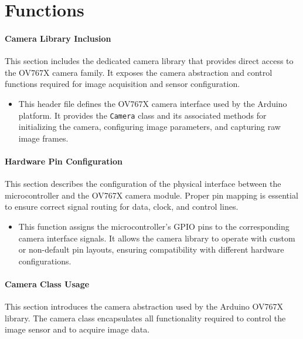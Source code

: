 \section{Functions}

\paragraph{Camera Library Inclusion}
This section includes the dedicated camera library that provides direct access to the OV767X camera family. It exposes the camera abstraction and control functions required for image acquisition and sensor configuration.

\begin{itemize}
	\item {} 
	
	This header file defines the OV767X camera interface used by the Arduino platform. It provides the \texttt{Camera} class and its associated methods for initializing the camera, configuring image parameters, and capturing raw image frames.
\end{itemize}

\paragraph{Hardware Pin Configuration}
This section describes the configuration of the physical interface between the microcontroller and the OV767X camera module. Proper pin mapping is essential to ensure correct signal routing for data, clock, and control lines.

\begin{itemize}
	\item {} 
	
	This function assigns the microcontroller’s GPIO pins to the corresponding camera interface signals. It allows the camera library to operate with custom or non-default pin layouts, ensuring compatibility with different hardware configurations.
\end{itemize}


\paragraph{Camera Class Usage}
This section introduces the camera abstraction used by the Arduino OV767X library. The camera class encapsulates all functionality required to control the image sensor and to acquire image data.

